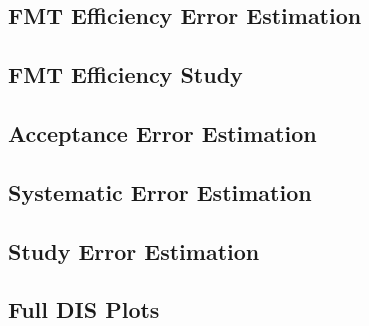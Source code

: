 \subsection*{FMT Efficiency Error Estimation}


\subsection*{FMT Efficiency Study}


\subsection*{Acceptance Error Estimation}


\subsection*{Systematic Error Estimation}


\subsection*{Study Error Estimation}


\subsection*{Full DIS Plots}


% 

